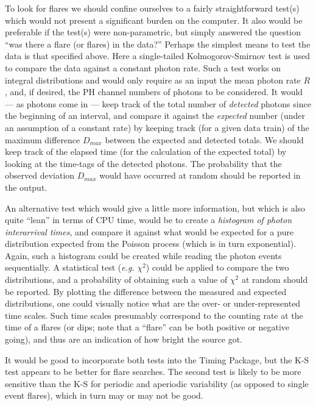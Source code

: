 To look for flares we should confine ourselves to a fairly
straightforward test(s) which would not present a significant burden
on the computer.  It also would be preferable if the test(s) were
non-parametric, but simply answered the question ``was there a flare
(or flares) in the data?''  Perhaps the simplest means to test the
data is that specified above.  Here a single-tailed Kolmogorov-Smirnov
test is used to compare the data against a constant photon rate.  Such a
test works on integral distributions and would only require as an
input the mean photon rate $R$, and, if desired, the PH channel numbers
of photons to be considered.  It would --- as photons come in --- keep
track of the total number of {\it detected} photons since the
beginning of an interval, and compare it against the
{\it expected} number (under an assumption of a constant rate) by
keeping track (for a given data train) of the maximum difference
$D_{max}$ between the expected and detected totals.  We should keep
track of the elapsed time (for the calculation of the expected total)
by looking at the time-tags of the detected photons.  The probability
that the observed deviation $D_{max}$ would have occurred at random
should be reported in the output.

An alternative test which would give a little more information,
but which is also quite ``lean'' in terms of CPU time, would be to
create a {\it histogram of photon interarrival times}, and
compare it against what would be expected for a pure distribution
expected from the Poisson process (which is in turn exponential).
Again, such a histogram could be created while reading the photon
events sequentially. A statistical test ({\it e.g.} $\chi^2$) could be
applied to compare the two distributions, and a probability of
obtaining such a value of $\chi^2$ at random should be reported.  By
plotting the difference between the measured and expected
distributions, one could visually notice what are the over- or
under-represented time scales.  Such time scales presumably correspond
to the counting rate at the time of a flares (or dips; note that
a ``flare'' can be both positive or negative going), and
thus are an indication of how bright the source got.

It would be good to incorporate both tests into the Timing Package,
but the K-S test appears to be better for flare searches.  The second
test is likely to be more sensitive than the K-S for periodic and
aperiodic variability (as opposed to single event flares), which in
turn may or may not be good.

\vfill\eject
